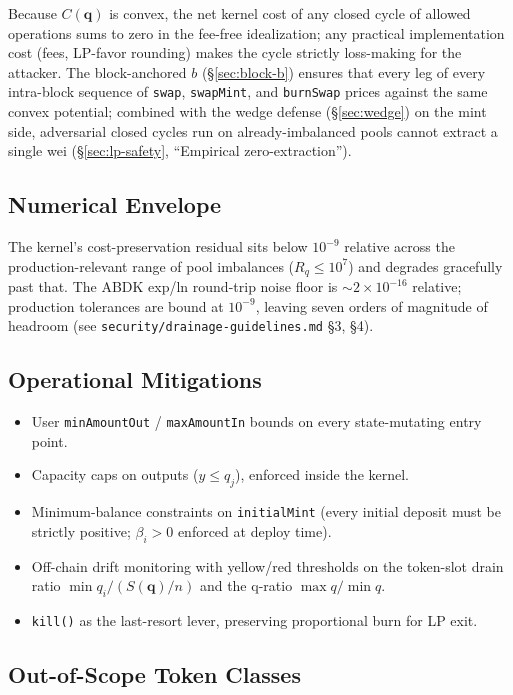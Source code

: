 \documentclass[11pt]{article}
\newcommand{\Sm}{S(\mathbf{q})}
\begin{document}
Because $C(\mathbf{q})$ is convex, the net kernel cost of any closed
cycle of allowed operations sums to zero in the fee-free idealization;
any practical implementation cost (fees, LP-favor rounding) makes the
cycle strictly loss-making for the attacker. The block-anchored $b$
(\S\ref{sec:block-b}) ensures that every leg of every intra-block
sequence of \texttt{swap}, \texttt{swapMint}, and \texttt{burnSwap}
prices against the same convex potential; combined with the
wedge defense (\S\ref{sec:wedge}) on the mint side,
adversarial closed cycles run on already-imbalanced pools cannot
extract a single wei (\S\ref{sec:lp-safety}, ``Empirical
zero-extraction'').

\subsection{Numerical Envelope}

The kernel's cost-preservation residual sits below $10^{-9}$ relative across
the production-relevant range of pool imbalances ($R_q \le 10^7$) and degrades
gracefully past that. The ABDK exp/ln round-trip noise floor is
$\sim 2 \times 10^{-16}$ relative; production tolerances are bound at
$10^{-9}$, leaving seven orders of magnitude of headroom (see
\texttt{security/drainage-guidelines.md} \S3, \S4).

\subsection{Operational Mitigations}

\begin{itemize}
  \item User \texttt{minAmountOut} / \texttt{maxAmountIn} bounds on every
        state-mutating entry point.
  \item Capacity caps on outputs ($y \le q_j$), enforced inside the kernel.
  \item Minimum-balance constraints on \texttt{initialMint} (every initial
        deposit must be strictly positive; \texttt{$\beta_i > 0$} enforced at
        deploy time).
  \item Off-chain drift monitoring with yellow/red thresholds on the
        token-slot drain ratio $\min q_i / (\Sm/n)$ and the q-ratio
        $\max q / \min q$.
  \item \texttt{kill()} as the last-resort lever, preserving proportional
        burn for LP exit.
\end{itemize}

\subsection{Out-of-Scope Token Classes}
\end{document}
